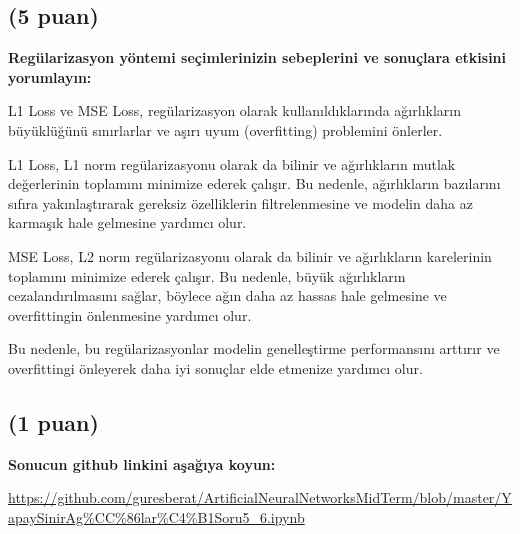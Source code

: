 \documentclass[11pt]{article}
\begin{document}
\subsection{(5 puan)} \textbf{Regülarizasyon yöntemi seçimlerinizin sebeplerini ve sonuçlara etkisini yorumlayın:}

L1 Loss ve MSE Loss, regülarizasyon olarak kullanıldıklarında ağırlıkların büyüklüğünü sınırlarlar ve aşırı uyum (overfitting) problemini önlerler.

L1 Loss, L1 norm regülarizasyonu olarak da bilinir ve ağırlıkların mutlak değerlerinin toplamını minimize ederek çalışır. Bu nedenle, ağırlıkların bazılarını sıfıra yakınlaştırarak gereksiz özelliklerin filtrelenmesine ve modelin daha az karmaşık hale gelmesine yardımcı olur.

MSE Loss, L2 norm regülarizasyonu olarak da bilinir ve ağırlıkların karelerinin toplamını minimize ederek çalışır. Bu nedenle, büyük ağırlıkların cezalandırılmasını sağlar, böylece ağın daha az hassas hale gelmesine ve overfittingin önlenmesine yardımcı olur.

Bu nedenle, bu regülarizasyonlar modelin genelleştirme performansını arttırır ve overfittingi önleyerek daha iyi sonuçlar elde etmenize yardımcı olur.

\subsection{(1 puan)} \textbf{Sonucun github linkini  aşağıya koyun:}

\url{https://github.com/guresberat/ArtificialNeuralNetworksMidTerm/blob/master/YapaySinirAg%CC%86lar%C4%B1Soru5_6.ipynb}
\end{document}
